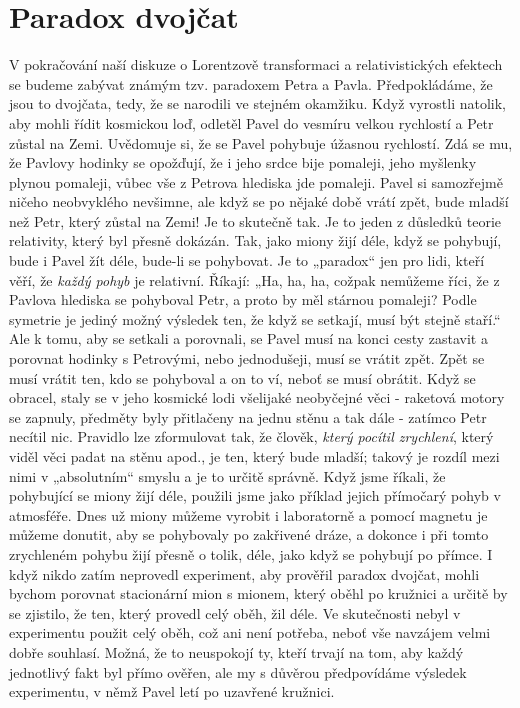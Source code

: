 {  \section{Paradox dvojčat}\label{fyz:IchapXVIsecII}
    V pokračování naší diskuze o Lorentzově transformaci a relativistických efektech se budeme 
    zabývat známým tzv. paradoxem Petra a Pavla. Předpokládáme, že jsou to dvojčata, tedy, že se 
    narodili ve stejném okamžiku. Když vyrostli natolik, aby mohli řídit kosmickou loď, odletěl 
    Pavel do vesmíru velkou rychlostí a Petr zůstal na Zemi. Uvědomuje si, že se Pavel pohybuje 
    úžasnou rychlostí. Zdá se mu, že Pavlovy hodinky se opožďují, že i jeho srdce bije pomaleji, 
    jeho myšlenky plynou pomaleji, vůbec vše z Petrova hlediska jde pomaleji. Pavel si samozřejmě 
    ničeho neobvyklého nevšimne, ale když se po nějaké době vrátí zpět, bude mladší než Petr, který 
    zůstal na Zemi! Je to skutečně tak. Je to jeden z důsledků teorie relativity, který byl přesně 
    dokázán. Tak, jako miony žijí déle, když se pohybují, bude i Pavel žít déle, bude-li se 
    pohybovat. Je to „paradox“ jen pro lidi, kteří věří, že \emph{každý pohyb} je relativní. 
    Říkají: „Ha, ha, ha, cožpak nemůžeme říci, že z Pavlova hlediska se pohyboval Petr, a proto by 
    měl stárnou pomaleji? Podle symetrie je jediný možný výsledek ten, že když se setkají, musí být 
    stejně staří.“ Ale k tomu, aby se setkali a porovnali, se Pavel musí na konci cesty zastavit a 
    porovnat hodinky s Petrovými, nebo jednodušeji, musí se vrátit zpět. Zpět se musí vrátit ten, 
    kdo se pohyboval a on to ví, neboť se musí obrátit. Když se obracel, staly se v jeho kosmické 
    lodi všelijaké neobyčejné věci - raketová motory se zapnuly, předměty byly přitlačeny na jednu 
    stěnu a tak dále - zatímco Petr necítil nic. Pravidlo lze zformulovat tak, že člověk, 
    \emph{který pocítil zrychlení}, který viděl věci padat na stěnu apod., je ten, který bude 
    mladší; takový je rozdíl mezi nimi v „absolutním“ smyslu a je to určitě správně. Když jsme 
    říkali, že pohybující se miony žijí déle, použili jsme jako příklad jejich přímočarý pohyb v 
    atmosféře. Dnes už miony můžeme vyrobit i laboratorně a pomocí magnetu je můžeme donutit, aby 
    se pohybovaly po zakřivené dráze, a dokonce i při tomto zrychleném pohybu žijí přesně o tolik, 
    déle, jako když se pohybují po přímce. I když nikdo zatím neprovedl experiment, aby prověřil 
    paradox dvojčat, mohli bychom porovnat stacionární mion s mionem, který oběhl po kružnici a 
    určitě by se zjistilo, že ten, který provedl celý oběh, žil déle. Ve skutečnosti nebyl v 
    experimentu použit celý oběh, což ani není potřeba, neboť vše navzájem velmi dobře souhlasí. 
    Možná, že to neuspokojí ty, kteří trvají na tom, aby každý jednotlivý fakt byl přímo ověřen, 
    ale my s důvěrou předpovídáme výsledek experimentu, v němž Pavel letí po uzavřené kružnici.
    
}
